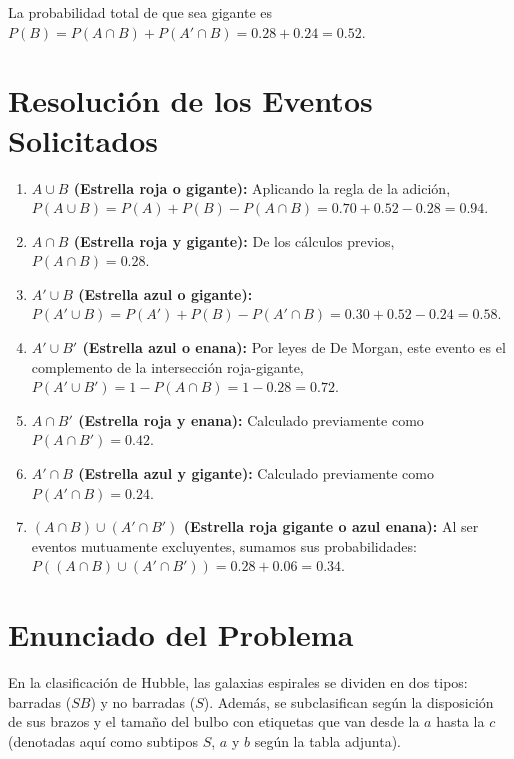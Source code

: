\documentclass[12pt]{article}
\begin{document}
La probabilidad total de que sea gigante es $P(B) = P(A \cap B) + P(A' \cap B) = 0.28 + 0.24 = 0.52$.

\section{Resolución de los Eventos Solicitados}

\begin{enumerate}
    \item \textbf{$A \cup B$ (Estrella roja o gigante):} Aplicando la regla de la adición, $P(A \cup B) = P(A) + P(B) - P(A \cap B) = 0.70 + 0.52 - 0.28 = 0.94$.

    \item \textbf{$A \cap B$ (Estrella roja y gigante):} De los cálculos previos, $P(A \cap B) = 0.28$.

    \item \textbf{$A' \cup B$ (Estrella azul o gigante):} $P(A' \cup B) = P(A') + P(B) - P(A' \cap B) = 0.30 + 0.52 - 0.24 = 0.58$.

    \item \textbf{$A' \cup B'$ (Estrella azul o enana):} Por leyes de De Morgan, este evento es el complemento de la intersección roja-gigante, $P(A' \cup B') = 1 - P(A \cap B) = 1 - 0.28 = 0.72$.

    \item \textbf{$A \cap B'$ (Estrella roja y enana):} Calculado previamente como $P(A \cap B') = 0.42$.

    \item \textbf{$A' \cap B$ (Estrella azul y gigante):} Calculado previamente como $P(A' \cap B) = 0.24$.

    \item \textbf{$(A \cap B) \cup (A' \cap B')$ (Estrella roja gigante o azul enana):} Al ser eventos mutuamente excluyentes, sumamos sus probabilidades: $P((A \cap B) \cup (A' \cap B')) = 0.28 + 0.06 = 0.34$.
\end{enumerate}

\section{Enunciado del Problema}
En la clasificación de Hubble, las galaxias espirales se dividen en dos tipos: barradas ($SB$) y no barradas ($S$). Además, se subclasifican según la disposición de sus brazos y el tamaño del bulbo con etiquetas que van desde la $a$ hasta la $c$ (denotadas aquí como subtipos $S$, $a$ y $b$ según la tabla adjunta).
\end{document}
